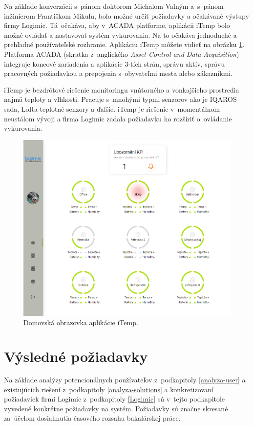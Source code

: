 Na základe konverzácii s~pánom doktorom Michalom Valným a~s~pánom inžinierom Františkom Mikulu, bolo možné určiť požiadavky a očakávané výstupy firmy Logimic. 
Tá~očakáva, aby v~ACADA platforme, aplikácii iTemp bolo možné ovládať a nastavovať systém vykurovania. 
Na to očakáva jednoduché a prehľadné používateľské rozhranie. Aplikáciu iTemp môžete vidieť na obrázku \ref{fig:iTemp}.
Platforma ACADA (skratka z~anglického \emph{Asset Control and Data Acquisition}) integruje koncové zariadenia a aplikácie 3-tích strán, správu aktív, správu pracovných požiadavkou a prepojenia s~obyvateľmi mesta alebo zákazníkmi.

iTemp je bezdrôtové riešenie monitoringu vnútorného a vonkajšieho prostredia najmä teploty a vlhkosti. 
Pracuje s~mnohými typmi senzorov ako je IQAROS sada, LoRa teplotné senzory a ďalšie. 
iTemp je riešenie v~momentálnom neustálom vývoji a firma Logimic zadala požiadavku ho rozšíriť o~ovládanie vykurovania.

\begin{figure}[H]
    \centering
    \includegraphics[width=\textwidth]{obrazky-figures/Screenshot_12.png}
    \caption{Domovská obrazovka aplikácie iTemp.}
    \label{fig:iTemp}
\end{figure}

\section{Výsledné požiadavky}\label{analyza-requirements}
Na základe analýzy potencionálnych používateľov z~podkapitoly \ref{analyza-user} a  existujúcich riešení z~podkapitoly \ref{analyza-solutions} a konkretizovaní požiadaviek firmi Logimic z~podkapitoly \ref{Logimic} sú v~tejto podkapitole vyvedené konkrétne požiadavky na systém. 
Požiadavky sú značne skresané za~účelom dosiahnutia časového rozsahu bakalárskej práce.


